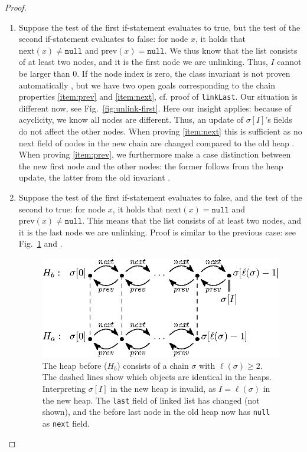 \documentclass[runningheads]{llncs}
\theoremstyle{remark}
\begin{document}
\begin{proof}
\begin{enumerate}
    \item Suppose the test of the first if-statement evaluates to true, but the test of the second if-statement evaluates to false: for node $x$, it holds that $\mathrm{next}(x)\neq\mathtt{null}$ and $\mathrm{prev}(x)=\mathtt{null}$. We thus know that the list consists of at least two nodes, and it is the first node we are unlinking. Thus, $I$ cannot be larger than 0. If the node index is zero, the class invariant is not proven automatically , but we have two open goals corresponding to the chain properties \ref{item:prev} and \ref{item:next}, cf. proof of \texttt{linkLast}. Our situation is different now, see Fig.~\ref{fig:unlink-first}. Here our insight applies: because of acyclicity, we know all nodes are different. Thus, an update of $\sigma[I]$'s fields do not affect the other nodes. When proving \ref{item:next} this is sufficient as no next field of nodes in the new chain are changed compared to the old heap . When proving \ref{item:prev}, we furthermore make a case distinction between the new first node and the other nodes: the former follows from the heap update, the latter from the old invariant .
    
    \item Suppose the test of the first if-statement evaluates to false, and the test of the second to true: for node $x$, it holds that $\mathrm{next}(x)=\mathtt{null}$ and $\mathrm{prev}(x)\neq\mathtt{null}$. This means that the list consists of at least two nodes, and it is the last node we are unlinking. Proof is similar to the previous case: see Fig.~\ref{fig:unlink-last} and .

\begin{figure}
   \centering
   \includegraphics[scale=1]{figures/linkedlist-unlink-last.eps}
   \caption{The heap before ($H_b$) consists of a chain $\sigma$ with $\ell(\sigma)\geq 2$. The dashed lines show which objects are identical in the heaps. Interpreting $\sigma[I]$ in the new heap is invalid, as $I=\ell(\sigma)$ in the new heap. The \texttt{last} field of linked list has changed (not shown), and the before last node in the old heap now has \texttt{null} as \texttt{next} field.}
   \vspace*{-12pt}
   \label{fig:unlink-last}
\end{figure}


\end{enumerate}
\end{proof}
\end{document}
